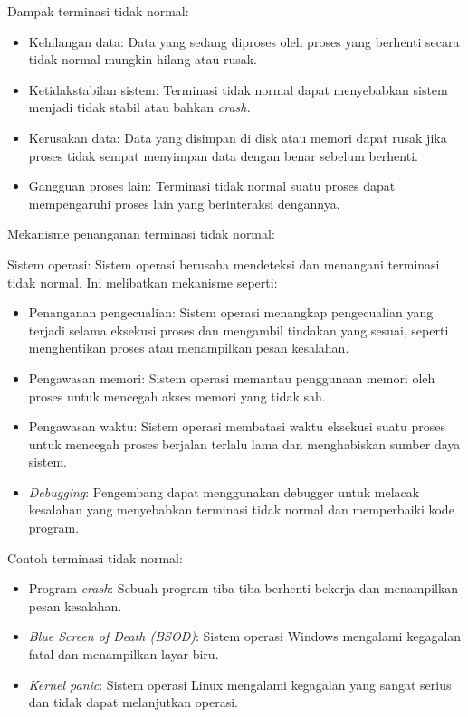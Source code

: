 \documentclass[12pt]{article}
\begin{document}
\begin{itemize}
    Dampak terminasi tidak normal:
    \begin{itemize}
        \item Kehilangan data: Data yang sedang diproses oleh proses yang berhenti secara tidak normal mungkin hilang atau rusak.
        \item Ketidakstabilan sistem: Terminasi tidak normal dapat menyebabkan sistem menjadi tidak stabil atau bahkan \textit{ crash.}
        \item Kerusakan data: Data yang disimpan di disk atau memori dapat rusak jika proses tidak sempat menyimpan data dengan benar sebelum berhenti.
        \item Gangguan proses lain: Terminasi tidak normal suatu proses dapat mempengaruhi proses lain yang berinteraksi dengannya.
    \end{itemize}
    
    Mekanisme penanganan terminasi tidak normal:
    \begin{itemize}
        Sistem operasi: Sistem operasi berusaha mendeteksi dan menangani terminasi tidak normal. Ini melibatkan mekanisme seperti:
    \end{itemize}
    
    \begin{itemize}
        \item Penanganan pengecualian: Sistem operasi menangkap pengecualian yang terjadi selama eksekusi proses dan mengambil tindakan yang sesuai, seperti menghentikan proses atau menampilkan pesan kesalahan.
        \item Pengawasan memori: Sistem operasi memantau penggunaan memori oleh proses untuk mencegah akses memori yang tidak sah.
        \item Pengawasan waktu: Sistem operasi membatasi waktu eksekusi suatu proses untuk mencegah proses berjalan terlalu lama dan menghabiskan sumber daya sistem.
        \item \textit{Debugging}: Pengembang dapat menggunakan debugger untuk melacak kesalahan yang menyebabkan terminasi tidak normal dan memperbaiki kode program.
    \end{itemize}
    
    Contoh terminasi tidak normal:
    \begin{itemize}
        \item Program \textit{crash}: Sebuah program tiba-tiba berhenti bekerja dan menampilkan pesan kesalahan.
        \item \textit{Blue Screen of Death (BSOD)}: Sistem operasi Windows mengalami kegagalan fatal dan menampilkan layar biru.
        \item \textit{Kernel panic}: Sistem operasi Linux mengalami kegagalan yang sangat serius dan tidak dapat melanjutkan operasi.
    \end{itemize}
    

\end{itemize}
\end{document}

